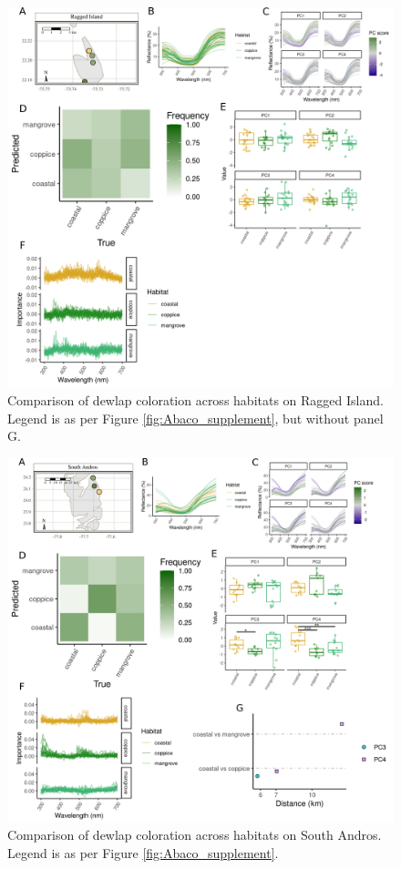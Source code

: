 \begin{figure}[H]
	\centering
	\includegraphics[width=\textwidth]{figures/RaggedIsland_supplement.png}
	\caption{Comparison of dewlap coloration across habitats on Ragged Island. Legend is as per Figure \ref{fig:Abaco_supplement}, but without panel G.}
	\label{fig:RaggedIsland}
\end{figure}

\begin{figure}[H]
	\centering
	\includegraphics[width=\textwidth]{figures/SouthAndros_supplement.png}
	\caption{Comparison of dewlap coloration across habitats on South Andros. Legend is as per Figure \ref{fig:Abaco_supplement}.}
	\label{fig:SouthAndros}
\end{figure}

